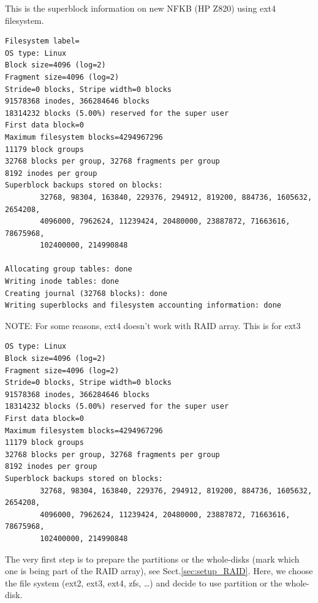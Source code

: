 This is the superblock information on new NFKB (HP Z820) using ext4 filesystem.
\begin{verbatim}
Filesystem label=
OS type: Linux
Block size=4096 (log=2)
Fragment size=4096 (log=2)
Stride=0 blocks, Stripe width=0 blocks
91578368 inodes, 366284646 blocks
18314232 blocks (5.00%) reserved for the super user
First data block=0
Maximum filesystem blocks=4294967296
11179 block groups
32768 blocks per group, 32768 fragments per group
8192 inodes per group
Superblock backups stored on blocks: 
        32768, 98304, 163840, 229376, 294912, 819200, 884736, 1605632, 2654208, 
        4096000, 7962624, 11239424, 20480000, 23887872, 71663616, 78675968, 
        102400000, 214990848

Allocating group tables: done                            
Writing inode tables: done                            
Creating journal (32768 blocks): done
Writing superblocks and filesystem accounting information: done   
\end{verbatim}

NOTE: For some reasons, ext4 doesn't work with RAID array. This is for ext3
\begin{verbatim}
OS type: Linux
Block size=4096 (log=2)
Fragment size=4096 (log=2)
Stride=0 blocks, Stripe width=0 blocks
91578368 inodes, 366284646 blocks
18314232 blocks (5.00%) reserved for the super user
First data block=0
Maximum filesystem blocks=4294967296
11179 block groups
32768 blocks per group, 32768 fragments per group
8192 inodes per group
Superblock backups stored on blocks: 
        32768, 98304, 163840, 229376, 294912, 819200, 884736, 1605632, 2654208, 
        4096000, 7962624, 11239424, 20480000, 23887872, 71663616, 78675968, 
        102400000, 214990848
\end{verbatim}


The very first step is to prepare the partitions or the whole-disks (mark which
one is being part of the RAID array), see Sect.\ref{sec:setup_RAID}. Here, we choose the file
system (ext2, ext3, ext4, zfs, \ldots) and decide to use partition or the
whole-disk.

